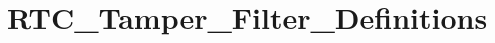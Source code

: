 \hypertarget{group___r_t_c___tamper___filter___definitions}{\section{R\-T\-C\-\_\-\-Tamper\-\_\-\-Filter\-\_\-\-Definitions}
\label{group___r_t_c___tamper___filter___definitions}
}
